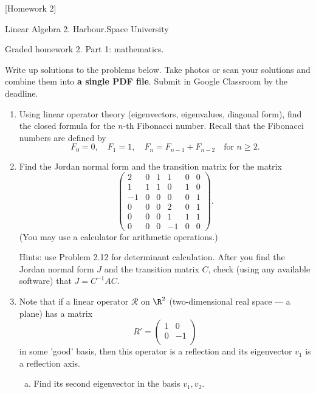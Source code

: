 [Homework 2]

\begin{center}
Linear Algebra 2. Harbour.Space University

Graded homework 2. Part 1: mathematics.
\end{center}

Write up solutions to the problems below. Take photos or scan your solutions and combine them into {\bf a single PDF file}. Submit in Google Classroom by the deadline.

\begin{enumerate}[1. ]
\item Using linear operator theory (eigenvectors, eigenvalues, diagonal form), find the closed formula for the $n$-th Fibonacci number. Recall that the Fibonacci numbers are defined by
$$
F_0 = 0, \quad F_1 = 1, \quad F_n = F_{n-1} + F_{n-2} \quad \text{for } n \geq 2.
$$

\item Find the Jordan normal form and the transition matrix for the matrix
$$
\begin{pmatrix}
        2 & 0 & 1 & 1 & 0 & 0 \\
        1 & 1 & 1 & 0 & 1 & 0 \\
        -1 & 0 & 0 & 0 & 0 & 1 \\
        0 & 0 & 0 & 2 & 0 & 1 \\
        0 & 0 & 0 & 1 & 1 & 1 \\
        0 & 0 & 0 & -1 & 0 & 0
\end{pmatrix}.
$$
(You may use a calculator for arithmetic operations.)

Hints: use Problem 2.12 for determinant calculation. After you find the Jordan normal form $J$ and the transition matrix $C$, check (using any available software) that $J = C^{-1}AC$.

\item Note that if a linear operator $\mathcal{R}$ on $\R^2$ (two-dimensional real space --- a plane) has a matrix
$$
R' = \begin{pmatrix}
    1 & 0\\
    0 & -1\\
\end{pmatrix}
$$
in some 'good' basis, then this operator is a reflection and its eigenvector $v_1$ is a reflection axis.

\begin{enumerate}[a) ]
\item Find its second eigenvector in the basis  $v_1, v_2$.


\end{enumerate}
\end{enumerate}
